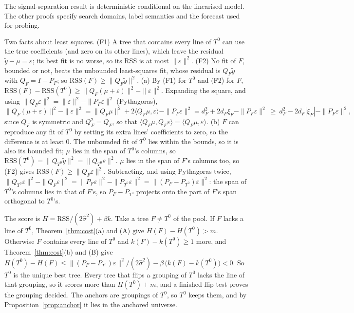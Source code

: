 \documentclass[journal,onecolumn,11pt]{IEEEtran}
\begin{document}
The signal-separation result is deterministic conditional on the linearised model. The other proofs specify search
domains, label semantics and the forecast used for probing.

\begin{IEEEproof}
Two facts about least squares. (F1) A tree that contains every line of $T^0$ can use the true coefficients (and zero on its
other lines), which leave the residual $\tilde y-\mu=\varepsilon$; its best fit is no worse, so its RSS is at most
$\|\varepsilon\|^2$. (F2) No fit of $F$, bounded or not, beats the unbounded least-squares fit, whose residual is
$Q_F\tilde y$ with $Q_F=I-P_F$; so $\mathrm{RSS}(F)\ge\|Q_F\tilde y\|^2$.
(a) By (F1) for $T^0$ and (F2) for $F$, $\mathrm{RSS}(F)-\mathrm{RSS}(T^0)\ge\|Q_F(\mu+\varepsilon)\|^2-\|\varepsilon\|^2$.
Expanding the square, and using $\|Q_F\varepsilon\|^2=\|\varepsilon\|^2-\|P_F\varepsilon\|^2$ (Pythagoras),
\[
\|Q_F(\mu+\varepsilon)\|^2-\|\varepsilon\|^2=\|Q_F\mu\|^2+2\langle Q_F\mu,\varepsilon\rangle-\|P_F\varepsilon\|^2
=d_F^2+2d_F\xi_F-\|P_F\varepsilon\|^2\ \ge\ d_F^2-2d_F|\xi_F|-\|P_F\varepsilon\|^2 ,
\]
since $Q_F$ is symmetric and $Q_F^2=Q_F$, so that $\langle Q_F\mu,Q_F\varepsilon\rangle=\langle Q_F\mu,\varepsilon\rangle$.
(b) $F$ can reproduce any fit of $T^0$ by setting its extra lines' coefficients to zero, so the difference is at least $0$.
The unbounded fit of $T^0$ lies within the bounds, so it is also its bounded fit; $\mu$ lies in the span of $T^0$'s columns, so
$\mathrm{RSS}(T^0)=\|Q_{T^0}\tilde y\|^2=\|Q_{T^0}\varepsilon\|^2$. $\mu$ lies in the span of $F$'s columns too, so (F2) gives
$\mathrm{RSS}(F)\ge\|Q_F\varepsilon\|^2$. Subtracting, and using Pythagoras twice,
$\|Q_{T^0}\varepsilon\|^2-\|Q_F\varepsilon\|^2=\|P_F\varepsilon\|^2-\|P_{T^0}\varepsilon\|^2=\|(P_F-P_{T^0})\varepsilon\|^2$:
the span of $T^0$'s columns lies in that of $F$'s, so $P_F-P_{T^0}$ projects onto the part of $F$'s span orthogonal to
$T^0$'s.
\end{IEEEproof}

\begin{IEEEproof}
The score is $H=\mathrm{RSS}/(2\hat\sigma^2)+\beta k$. Take a tree $F\ne T^0$ of the pool. If $F$ lacks a line of $T^0$,
Theorem~\ref{thm:cost}(a) and (A) give $H(F)-H(T^0)>m$. Otherwise $F$ contains every line of $T^0$ and $k(F)-k(T^0)\ge1$ more, and Theorem~\ref{thm:cost}(b) and (B) give
$H(T^0)-H(F)\le\|(P_F-P_{T^0})\varepsilon\|^2/(2\hat\sigma^2)-\beta\,\big(k(F)-k(T^0)\big)<0$. So $T^0$ is the unique best
tree. Every tree that flips a grouping of $T^0$ lacks the line of that grouping, so it scores more than $H(T^0)+m$, and a
finished flip test proves the grouping decided. The anchors are groupings of $T^0$, so $T^0$ keeps them, and by
Proposition~\ref{prop:anchor} it lies in the anchored universe.
\end{IEEEproof}
\end{document}
